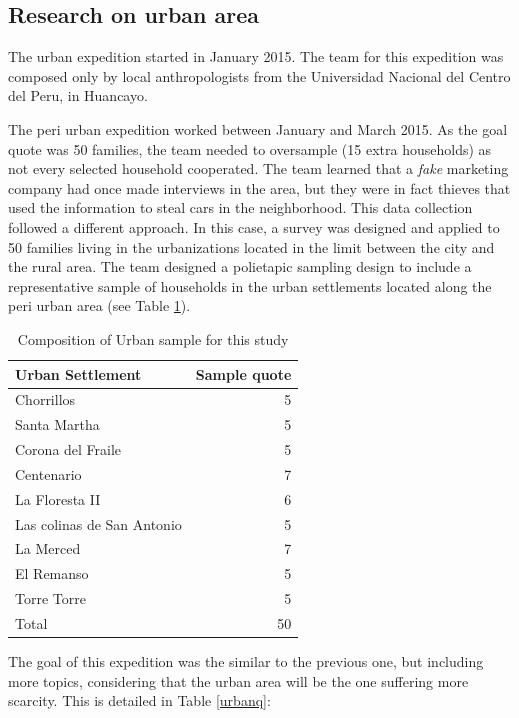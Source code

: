 \documentclass{article}
\begin{document}
\subsection{Research on urban area}

The urban expedition started in January 2015. The team for this expedition was composed only by local anthropologists from the Universidad Nacional del Centro del Peru, in Huancayo. 

The peri urban expedition worked between January and March 2015. As the goal quote was 50 families, the team needed to oversample (15 extra households) as not every selected household cooperated. The team learned that a \emph{fake} marketing company had once made interviews in the area, but they were in fact thieves that used the information to steal cars in the neighborhood. This data collection followed a different approach. In this case, a survey was designed and applied to 50 families living in the urbanizations located in the limit between the city and the rural area. The team designed a polietapic sampling design to include a representative sample of households in the urban settlements located along the peri urban area (see Table \ref{urbansample}).



\begin{table}[ht]
\centering
\caption{Composition of Urban sample for this study}
\begin{tabular}{lr}
 Urban Settlement & Sample quote \\ 
  \hline
Chorrillos &   5 \\ 
  Santa Martha &   5 \\ 
  Corona del Fraile &   5 \\ 
  Centenario &   7 \\ 
  La Floresta II &   6 \\ 
  Las colinas de San Antonio &   5 \\ 
  La Merced &   7 \\ 
  El Remanso &   5 \\ 
  Torre Torre &   5 \\ 
   \hline
Total &  50 \\ 
  \end{tabular}\label{urbansample}
\end{table}


The goal of this expedition was the similar to the previous one, but including more topics, considering that the urban area will be the one suffering more scarcity. This is detailed in Table \ref{urbanq}:
\end{document}
